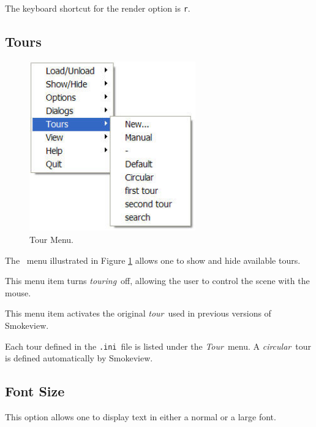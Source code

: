 \documentclass[11pt,twoside]{book}
\newcommand{\parma}{.75}
\newcommand{\parmb}{.5}
\newcommand{\parmc}{0.25}
\newcommand{\blist}{
\begin{list}
{}{
\setlength{\leftmargin}{\parma in}
\setlength{\labelwidth}{\parmb in}
\setlength{\labelsep}{\parmc in}
\setlength{\listparindent}{0.3in}
\setlength{\topsep}{.3in}
\setlength{\parsep}{.0in}
}}
\newcommand{\elist}{\end{list}}
\newcommand{\hitem}[1]{\item[{\bf #1} \hfill]}
\begin{document}
The keyboard shortcut for the render option is {\tt r}.

\subsection{Tours}
\begin{figure}[\figoptions]
\begin{center}
\includegraphics[width=2.8264in]{FIGURES/menu_tour}
\caption{Tour Menu.} \label{fig_tourmenu}
\end{center}
\end{figure}
The \ menu illustrated in Figure \ref{fig_tourmenu}
allows one to show and hide available tours.


\blist \hitem{Manual}This menu item turns {\em touring}\ off,
allowing the user to control the scene with the mouse.

\hitem{Default}This menu item activates the original {\em tour}\ used
in previous versions of Smokeview.

\hitem{List of tours}Each tour defined in the {\tt .ini}\ file is
listed under the {\em Tour}\ menu.  A {\em circular}\ tour is
defined automatically by Smokeview.

\elist


\subsection{Font Size}This option allows one to display text in either a normal or a large font.
\end{document}
